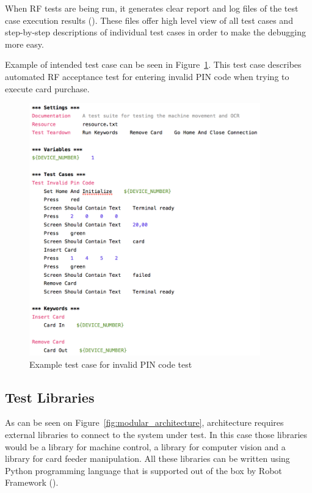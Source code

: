When RF tests are being run, it generates clear report and log files of the test case execution results (\emph{\cite{Rfuserguide}}). These files offer high level view of all test cases and step-by-step descriptions of individual test cases in order to make the debugging more easy.

Example of intended test case can be seen in Figure~\ref{fig:invalid_pin_test}. This test case describes automated RF acceptance test for entering invalid PIN code when trying to execute card purchase.

\begin{figure}[ht]
  \begin{center}
    \includegraphics[width=10cm]{images/example_test.png}
    \caption{Example test case for invalid PIN code test}
    \label{fig:invalid_pin_test}
  \end{center}
\end{figure}

\FloatBarrier
\subsection{Test Libraries}
\label{subsection:test libraries}

As can be seen on Figure~\ref{fig:modular_architecture}, architecture requires external libraries to connect to the system under test. In this case those libraries would be a library for machine control, a library for computer vision and a library for card feeder manipulation. All these libraries can be written using Python programming language that is supported out of the box by Robot Framework (\emph{\cite{robotframework}}).

